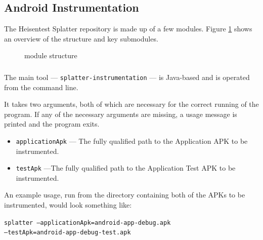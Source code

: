 \subsection{Android Instrumentation}

The Heisentest Splatter repository\cite{heisentestInstrumentation} is made up of a few modules. Figure \ref{fig:repo_structure} shows an overview of the structure and key submodules.

\begin{figure}[h]
\caption{\heisentest{} module structure}
\label{fig:repo_structure}
\end{figure}

\subsubsection{\splatterinst{}}

The main tool --- {\tt splatter-instrumentation} --- is Java-based and is operated from the command line.

It takes two arguments, both of which are necessary for the correct running of the program. If any of the necessary arguments are missing, a usage message is printed and the program exits.

\begin{itemize}
    \item \texttt{applicationApk} --- The fully qualified path to the Application APK to be instrumented.
    \item \texttt{testApk} ---The fully qualified path to the Application Test APK to be instrumented.
\end{itemize}

An example usage, run from the directory containing both of the APKs to be instrumented, would look something like:

\texttt{splatter --applicationApk=android-app-debug.apk\\--testApk=android-app-debug-test.apk}

